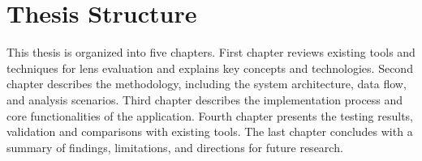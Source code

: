 \section*{Thesis Structure}
This thesis is organized into five chapters. First chapter reviews existing tools and techniques for lens evaluation and explains key concepts and technologies. Second chapter describes the methodology, including the system architecture, data flow, and analysis scenarios. Third chapter describes the implementation process and core functionalities of the application. Fourth chapter presents the testing results, validation and comparisons with existing tools. The last chapter concludes with a summary of findings, limitations, and directions for future research.
